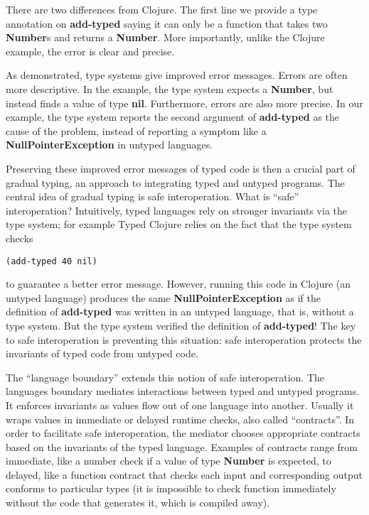 \documentclass[10pt]{article}
\begin{document}
There are two differences from Clojure.
The first line we provide a type annotation on \textbf{add-typed}
saying it can only be a function that takes two \textbf{Number}s and returns a
\textbf{Number}.
{
\color{red}
  More importantly, unlike the Clojure example,} 
the error is clear and precise.%

{
\color{red}
  As demonstrated,
type systems give improved error messages.}
Errors are often more descriptive.
In the example, the type system {\color{red}expects} a \textbf{Number}, but
{\color{red}instead finds} a value of type \textbf{nil}.
{\color{red}Furthermore,} errors are also more precise.
In our example, {\color{red}the type system reports} the second argument of \textbf{add-typed} as the cause of the problem,
instead of reporting a symptom like a \textbf{NullPointerException} in untyped languages.

{\color{red}Preserving these improved error messages of typed code is then a crucial part of
gradual typing,} an approach to integrating typed and untyped programs.
The central idea of gradual typing is safe interoperation.
What is ``safe'' interoperation?
Intuitively, typed languages rely on stronger invariants via the type system; for example
Typed Clojure relies on the fact that {\color{red} the type system checks}
\begin{verbatim}(add-typed 40 nil)\end{verbatim}
to guarantee a better error message.
However, running this code in Clojure (an untyped language)
produces the same \textbf{NullPointerException} as if the definition of \textbf{add-typed} was written
in an untyped language, that is, without a type system.
But {\color{red} the type system verified} the definition of \textbf{add-typed}!
{\color{red}The key to safe interoperation is preventing this situation:}
safe interoperation protects the invariants of typed code from untyped code.

{\color{red} The ``language boundary'' extends this notion of safe interoperation.}
The languages boundary {\color{red}mediates interactions} between typed and untyped programs.
It {\color{red}enforces invariants} as values flow out of one language into another.
Usually it wraps values in immediate or delayed runtime checks, also called ``contracts''.
In order to facilitate safe interoperation,
{\color{red}the mediator chooses appropriate contracts based on the invariants of the typed language}.
Examples of contracts range from immediate, like a number check if a value of type \textbf{Number} is expected,
to delayed, like a function contract that checks each input and corresponding output conforms to particular types (it
is impossible to check function immediately without the code that generates it, which is compiled away).
\end{document}
